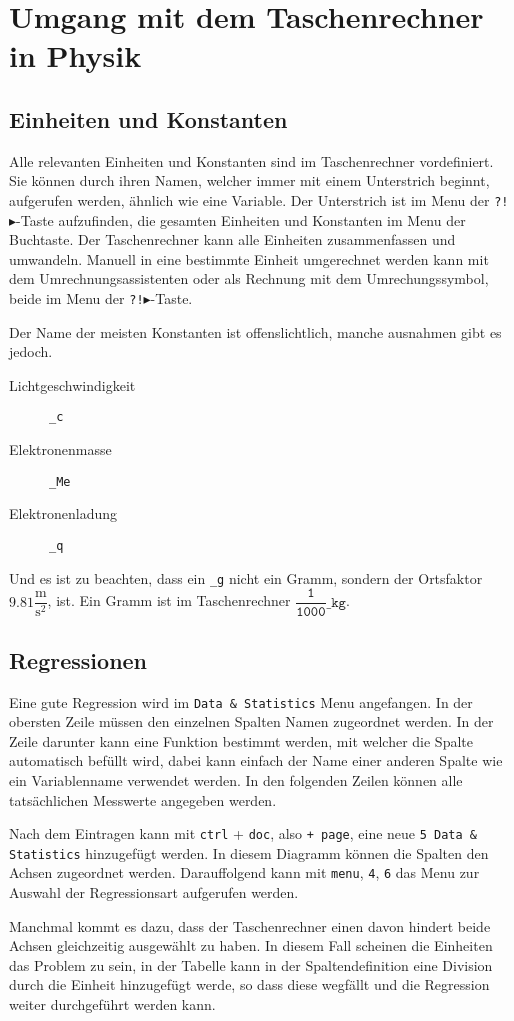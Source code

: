 \documentclass{article}
\begin{document}
\section{Umgang mit dem Taschenrechner in Physik} 
\subsection{Einheiten und Konstanten}
Alle relevanten Einheiten und Konstanten sind im Taschenrechner vordefiniert. Sie können durch ihren Namen, welcher immer mit einem Unterstrich beginnt, aufgerufen werden, ähnlich wie eine Variable. Der Unterstrich ist im Menu der \texttt{?!$\blacktriangleright$}-Taste aufzufinden, die gesamten Einheiten und Konstanten im Menu der Buchtaste. Der Taschenrechner kann alle Einheiten zusammenfassen und umwandeln. Manuell in eine bestimmte Einheit umgerechnet werden kann mit dem Umrechnungsassistenten oder als Rechnung mit dem Umrechungssymbol, beide im Menu der \texttt{?!$\blacktriangleright$}-Taste. \newline
 
Der Name der meisten Konstanten ist offenslichtlich, manche ausnahmen gibt es jedoch.
\begin{multicols}{3}
 \begin{description}
  \item[Lichtgeschwindigkeit] \texttt{\_c} 
  \item[Elektronenmasse] \texttt{\_Me}
  \item[Elektronenladung] \texttt{\_q} 
 \end{description} 
\end{multicols}
  
Und es ist zu beachten, dass ein \texttt{\_g} nicht ein Gramm, sondern der Ortsfaktor $9.81 \dfrac{\text{m}}{\text{s}^2}$, ist. Ein Gramm ist im Taschenrechner $\dfrac{\texttt{1}}{\mathtt{1000}} \texttt{\_kg}$.
 
\subsection{Regressionen}
Eine gute Regression wird im \texttt{Data \& Statistics} Menu angefangen. In der obersten Zeile müssen den einzelnen Spalten Namen zugeordnet werden. In der Zeile darunter kann eine Funktion bestimmt werden, mit welcher die Spalte automatisch befüllt wird, dabei kann einfach der Name einer anderen Spalte wie ein Variablenname verwendet werden. In den folgenden Zeilen können alle tatsächlichen Messwerte angegeben werden.
 
Nach dem Eintragen kann mit \texttt{ctrl} + \texttt{doc}, also \texttt{+ page}, eine neue \texttt{5 Data \& Statistics} hinzugefügt werden. In diesem Diagramm können die Spalten den Achsen zugeordnet werden. Darauffolgend kann mit \texttt{menu}, \texttt{4}, \texttt{6} das Menu zur Auswahl der Regressionsart aufgerufen werden.
 
Manchmal kommt es dazu, dass der Taschenrechner einen davon hindert beide Achsen gleichzeitig ausgewählt zu haben. In diesem Fall scheinen die Einheiten das Problem zu sein, in der Tabelle kann in der Spaltendefinition eine Division durch die Einheit hinzugefügt werde, so dass diese wegfällt und die Regression weiter durchgeführt werden kann. 
\end{document}
